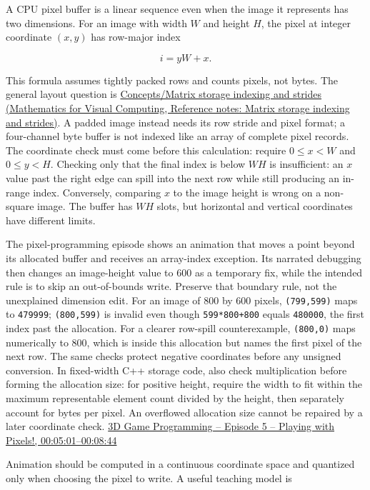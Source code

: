 A CPU pixel buffer is a linear sequence even when the image it represents has two dimensions. For an image with width \(W\) and height \(H\), the pixel at integer coordinate \((x,y)\) has row-major index

\[
i=yW+x.
\]

This formula assumes tightly packed rows and counts pixels, not bytes. The general layout question is \href{../02-Mathematics-for-Visual-Computing/main.pdf\#nameddest=appendix-ffdc1d4e5350}{Concepts/Matrix storage indexing and strides (Mathematics for Visual Computing, Reference notes: Matrix storage indexing and strides)}. A padded image instead needs its row stride and pixel format; a four-channel byte buffer is not indexed like an array of complete pixel records. The coordinate check must come before this calculation: require \(0\le x<W\) and \(0\le y<H\). Checking only that the final index is below \(WH\) is insufficient: an \(x\) value past the right edge can spill into the next row while still producing an in-range index. Conversely, comparing \(x\) to the image height is wrong on a non-square image. The buffer has \(WH\) slots, but horizontal and vertical coordinates have different limits.

The pixel-programming episode shows an animation that moves a point beyond its allocated buffer and receives an array-index exception. Its narrated debugging then changes an image-height value to 600 as a temporary fix, while the intended rule is to skip an out-of-bounds write. Preserve that boundary rule, not the unexplained dimension edit. For an image of 800 by 600 pixels, \texttt{(799,599)} maps to \texttt{479999}; \texttt{(800,599)} is invalid even though \texttt{599*800+800} equals \texttt{480000}, the first index past the allocation. For a clearer row-spill counterexample, \texttt{(800,0)} maps numerically to 800, which is inside this allocation but names the first pixel of the next row. The same checks protect negative coordinates before any unsigned conversion. In fixed-width C++ storage code, also check multiplication before forming the allocation size: for positive height, require the width to fit within the maximum representable element count divided by the height, then separately account for bytes per pixel. An overflowed allocation size cannot be repaired by a later coordinate check. \href{https://www.youtube.com/watch?v=dwn_UrItwfw&t=301s}{3D Game Programming -- Episode 5 -- Playing with Pixels!, 00:05:01--00:08:44}

Animation should be computed in a continuous coordinate space and quantized only when choosing the pixel to write. A useful teaching model is

